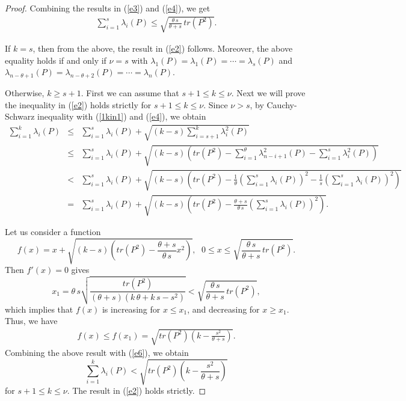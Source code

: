 \documentclass[12pt]{article}
\begin{document}
\begin{proof}
 \vspace*{3mm}

 \noindent
Combining the results in (\ref{e3}) and (\ref{e4}), we get
\begin{eqnarray}
\sum\limits^{s}_{i=1}\lambda_{i}(P)\leq \sqrt{\frac{\theta\,s}{\theta+s}\,tr(P^2)}. \nonumber
\end{eqnarray}

If $k=s$, then from the above, the result in (\ref{e2}) follows. Moreover, the above equality holds if and only if $\nu=s$ with $\lambda_1(P)=\lambda_1(P)=\cdots=\lambda_s(P)$ and $\lambda_{n-\theta+1}(P)=\lambda_{n-\theta+2}(P)=\cdots=\lambda_n(P)$. 

\vspace*{3mm}

\noindent
Otherwise, $k\geq s+1$. First we can assume that $s+1\leq k\leq \nu$. Next we will prove the inequality in (\ref{e2}) holds strictly for $s+1\leq k\leq
 \nu$. Since $\nu>s$, by Cauchy-Schwarz inequality with (\ref{1kin1}) and (\ref{e4}), we obtain
 \begin{eqnarray}
 \sum_{i=1}^{k}\lambda_i(P)&\leq&\sum\limits^{s}_{i=1}\lambda_{i}(P)+\sqrt{(k-s)\sum\limits^k_{i=s+1}\lambda_i^2(P)}\nonumber\\[3mm]
 &\leq&\sum\limits^{s}_{i=1}\lambda_{i}(P)+\sqrt{\left(k-s\right)\left(tr(P^2)-\sum\limits^{\theta}_{i=1}\lambda_{n-i+1}^2(P)-\sum\limits^{s}_{i=1}\lambda^2_{i}(P)\right)}\nonumber\\[3mm]
 &<&\sum\limits^{s}_{i=1}\lambda_{i}(P)+\sqrt{\left(k-s\right)\left(tr(P^2)-\frac{1}{\theta}\left(\sum\limits^{s}_{i=1}\lambda_{i}(P)\right)^2-\frac{1}{s}\left(\sum\limits^{s}_{i=1}\lambda_{i}(P)\right)^2\right)} \nonumber\\[3mm]
  &=&\sum\limits^{s}_{i=1}\lambda_{i}(P)+\sqrt{\left(k-s\right)\left(tr(P^2)-\frac{\theta+s}{\theta\,s}\left(\sum\limits^{s}_{i=1}\lambda_{i}(P)\right)^2\right)}. \label{e6}
 \end{eqnarray}

 \noindent
 Let us consider a function
  \begin{equation}
 f(x)= x+\sqrt{(k-s)\left(tr(P^2)-\frac{\theta+s}{\theta\,s}x^2\right)},\,~~0\leq x\leq \sqrt{\frac{\theta\,s}{\theta+s}\,tr(P^2)}.\nonumber
 \end{equation}
 Then $f'(x)=0$ gives
 $$x_1= \theta\,s\sqrt{\frac{tr(P^2)}{(\theta+s)(k\,\theta+k\,s-s^2)}}<\sqrt{\frac{\theta\,s}{\theta+s}\,tr(P^2)},$$
 which implies that $f(x)$ is increasing for $x\leq x_1$, and decreasing for $x\geq x_1$.
 Thus, we have
 \begin{eqnarray}
 f(x)\leq f(x_1)=\sqrt{tr(P^2)\left(k-\frac{s^2}{\theta+s}\right)}.\nonumber
 \end{eqnarray}
Combining the above result with (\ref{e6}), we obtain
\begin{equation}
 \sum_{i=1}^{k}\lambda_i(P)<\sqrt{tr(P^2)\left(k-\frac{s^2}{\theta+s}\right)}\label{1s1}
\end{equation}
for $s+1\leq k\leq \nu$. The result in (\ref{e2}) holds strictly. 


\end{proof}
\end{document}
